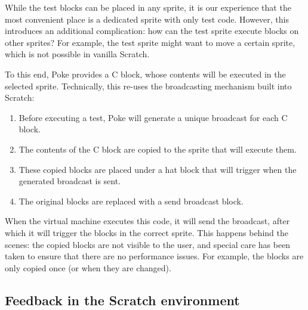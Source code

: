 \documentclass[../main]{subfiles}
\begin{document}
While the test blocks can be placed in any sprite, it is our experience that the most convenient place is a dedicated sprite with only test code.
However, this introduces an additional complication: how can the test sprite execute blocks on other sprites?
For example, the test sprite might want to move a certain sprite, which is not possible in vanilla Scratch.

To this end, Poke provides a C block, whose contents will be executed in the selected sprite.
Technically, this re-uses the broadcasting mechanism built into Scratch:

\begin{enumerate}
    \item Before executing a test, Poke will generate a unique broadcast for each C block.
    \item The contents of the C block are copied to the sprite that will execute them.
    \item These copied blocks are placed under a hat block that will trigger when the generated broadcast is sent.
    \item The original blocks are replaced with a send broadcast block.
\end{enumerate}

When the virtual machine executes this code, it will send the broadcast, after which it will trigger the blocks in the correct sprite.
This happens behind the scenes: the copied blocks are not visible to the user, and special care has been taken to ensure that there are no performance issues.
For example, the blocks are only copied once (or when they are changed).

\subsection{Feedback in the Scratch environment}\label{subsec:feedback-in-the-scratch-environment}
\end{document}
